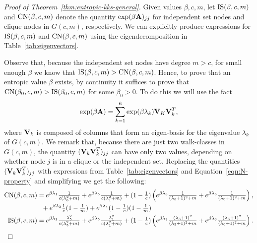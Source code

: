 \def\thetheorem{\ref{thm:entropic-kks-general}}
\begin{theorem}
    
\end{theorem}

\begin{proof}[Proof of Theorem~\ref{thm:entropic-kks-general}]
      Given values $\beta, c, m$, let $\textrm{IS}(\beta,c,m)$ and $\textrm{CN}(\beta,c,m)$ denote the quantity $\exp(\beta \textbf{A})_{jj}$ for independent set nodes and clique nodes in $G(c,m)$, respectively.
      We can explicitly produce expressions for $\textrm{IS}(\beta,c,m)$ and $\textrm{CN}(\beta,c,m)$ using the eigendecomposition in Table~\ref{tab:eigenvectors}.

      Observe that, because the independent set nodes have degree $m > c$, for small enough $\beta$ we know that $\textrm{IS}(\beta,c,m) > \textrm{CN}(\beta,c,m)$.
      Hence, to prove that an entropic value $\beta$ exists, by continuity it suffices to prove that $\textrm{CN}(\beta_0,c,m) > \textrm{IS}(\beta_0,c,m)$ for some $\beta_0 > 0$.
      To do this we will use the fact
      \[
          \exp(\beta\textbf{A}) = \sum_{k=1}^6 \exp(\beta \lambda_k) \textbf{V}_K \textbf{V}_k^T,
      \]
      where $\textbf{V}_k$ is composed of columns that form an eigen-basis for the eigenvalue $\lambda_k$ of $G(c,m)$.
      We remark that, because there are just two walk-classes in $G(c,m)$, the quantity $(\textbf{V}_k\textbf{V}_k^T)_{jj}$ can have only two values, depending on whether node $j$ is in a clique or the independent set.
      Replacing the quantities $(\textbf{V}_k\textbf{V}_k^T)_{jj}$ with expressions from Table~\ref{tab:eigenvectors} and Equation~\eqref{eqn:N-property} and simplifying we get the following:
      \begin{align*}
          \textrm{CN}(\beta,c,m) &=
                        e^{\beta\lambda_1} \tfrac{1}{c(\lambda_5^2 + m )} + e^{\beta\lambda_5} \tfrac{1}{c(\lambda_1^2 + m )}
                        + (1- \tfrac{1}{c})\left(e^{\beta\lambda_3} \tfrac{1}{(\lambda_3+1)^2 + m}
                        + e^{\beta\lambda_6} \tfrac{1}{(\lambda_6+1)^2 + m} \right),\\
                        &~~+ e^{\beta\lambda_2}\tfrac{1}{c}(1 - \tfrac{1}{m})
                      + e^{\beta\lambda_4}(1 - \tfrac{1}{c})(1 - \tfrac{1}{m}) \\
          \textrm{IS}(\beta,c,m) &=
              e^{\beta\lambda_1} \tfrac{\lambda_5^2 }{c(\lambda_5^2 + m)}
              + e^{\beta\lambda_5} \tfrac{\lambda_1^2 }{c(\lambda_1^2 + m)}
              + (1- \tfrac{1}{c})\left( e^{\beta\lambda_3} \tfrac{(\lambda_3+1)^2}{(\lambda_3+1)^2 + m}
              + e^{\beta\lambda_6} \tfrac{(\lambda_6+1)^2}{(\lambda_6+1)^2 + m} \right).
      \end{align*}


\end{proof}
